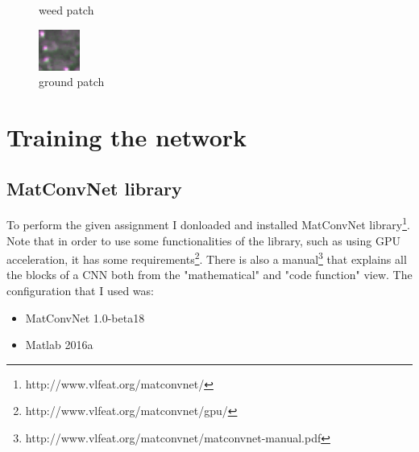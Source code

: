 \documentclass[]{report}
\begin{document}
\begin{figure}[!htb]
  \caption{weed patch}\label{fig:weed sample}
\endminipage\hfill
{}%
  \includegraphics[width=\linewidth]{ground.png}
  \caption{ground patch}\label{fig:ground sample}
\endminipage
\end{figure}



\chapter{Training the network}

\section{MatConvNet library}

To perform the given assignment I donloaded and installed MatConvNet library\footnote{http://www.vlfeat.org/matconvnet/}. Note that in order to use some functionalities of the library, such as using GPU acceleration, it has some requirements\footnote{http://www.vlfeat.org/matconvnet/gpu/}.
There is also a manual\footnote{http://www.vlfeat.org/matconvnet/matconvnet-manual.pdf} that explains all the blocks of a CNN both from the "mathematical" and "code function" view. The configuration that I used was:

\begin{itemize}

	\item MatConvNet 1.0-beta18
	\item Matlab 2016a	
	
\end{itemize}  
\end{document}
